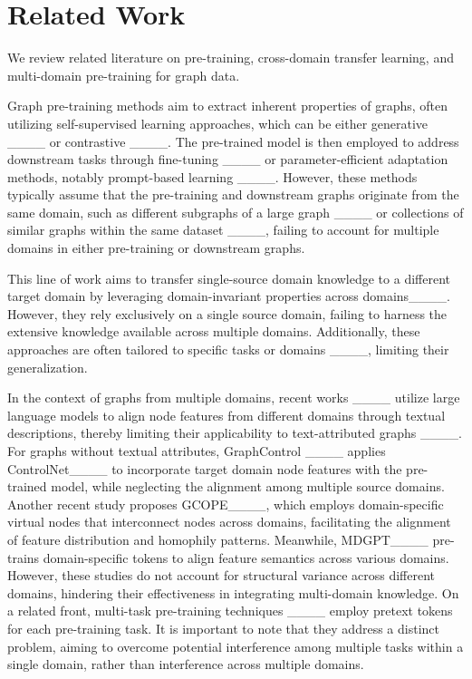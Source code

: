 \section{Related Work}
We review related literature on pre-training, cross-domain transfer learning, and multi-domain pre-training for graph data.

Graph pre-training methods aim to extract inherent properties of graphs, often utilizing self-supervised learning approaches, which can be either generative ____ or contrastive ____. The pre-trained model is then employed to address downstream tasks through fine-tuning ____ or parameter-efficient adaptation methods, notably prompt-based learning ____. However, these methods typically assume that the pre-training and downstream graphs originate from the same domain, such as different subgraphs of a large graph ____ or collections of similar graphs within the same dataset ____, failing to account for multiple domains in either pre-training or downstream graphs.

This line of work aims to transfer single-source domain knowledge to a different target domain by leveraging domain-invariant properties across domains____. However, they rely exclusively on a single source domain, failing to harness the extensive knowledge available across multiple domains. Additionally, these approaches are often tailored to specific tasks or domains ____, limiting their generalization.

In the context of graphs from multiple domains, recent works ____ utilize large language models to align node features from different domains through textual descriptions, thereby limiting their applicability to text-attributed graphs ____. For graphs without textual attributes, GraphControl ____ applies ControlNet____ to incorporate target domain node features with the pre-trained model, while neglecting the alignment among multiple source domains. Another recent study proposes GCOPE____, which employs domain-specific virtual nodes that interconnect nodes across domains, facilitating the alignment of feature distribution and homophily patterns. Meanwhile, MDGPT____ pre-trains domain-specific tokens to align feature semantics across various domains. However, these studies do not account for structural variance across different domains, hindering their effectiveness in integrating multi-domain knowledge. On a related front, multi-task pre-training techniques ____ employ pretext tokens for each pre-training task. It is important to note that they address a distinct problem, aiming to overcome potential interference among multiple tasks within a single domain, rather than interference across multiple domains. 
